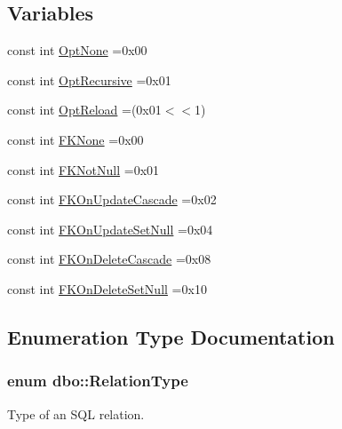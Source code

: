 \subsection*{Variables}
\begin{DoxyCompactItemize}
\item 
const int \hyperlink{namespacedbo_a47a23f634263db465e9394710b315393}{Opt\+None} =0x00
\item 
const int \hyperlink{namespacedbo_af04051dd11c9b2c8692319eaeee04224}{Opt\+Recursive} =0x01
\item 
const int \hyperlink{namespacedbo_a8fe48d016269671188c75d0e08589cde}{Opt\+Reload} =(0x01$<$$<$1)
\item 
const int \hyperlink{namespacedbo_a852726cb6e354fe0b7427952d7ee9bbd}{F\+K\+None} =0x00
\item 
const int \hyperlink{namespacedbo_aaee974161f0dade23c6dbd3aa44a145b}{F\+K\+Not\+Null} =0x01
\item 
const int \hyperlink{namespacedbo_ad015d5bfa1c6cfd1efbb7b6e97eb22ae}{F\+K\+On\+Update\+Cascade} =0x02
\item 
const int \hyperlink{namespacedbo_ac28416e0d117ea1806ceee4558b0f96b}{F\+K\+On\+Update\+Set\+Null} =0x04
\item 
const int \hyperlink{namespacedbo_a58edf54e3f9cb2c68130845cb2cff826}{F\+K\+On\+Delete\+Cascade} =0x08
\item 
const int \hyperlink{namespacedbo_ad8a98b325ad0becbd7231e924c6dbe26}{F\+K\+On\+Delete\+Set\+Null} =0x10
\end{DoxyCompactItemize}


\subsection{Enumeration Type Documentation}
\hypertarget{namespacedbo_ab7f92e64aea13b1e3b60021e72a9fc73}{
\subsubsection[{Relation\+Type}]{\setlength{\rightskip}{0pt plus 5cm}enum {\bf dbo\+::\+Relation\+Type}}}\label{namespacedbo_ab7f92e64aea13b1e3b60021e72a9fc73}


Type of an S\+Q\+L relation. 

